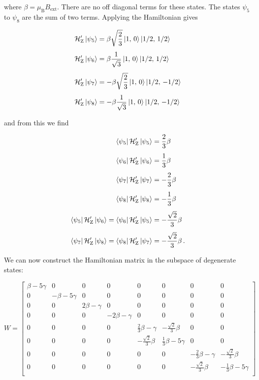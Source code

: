 \documentclass[12pt, titlepage]{article}
\begin{document}
where $\beta = \mu_\text{B}B_\text{ext}$. There are no off diagonal terms for these states. The states $\psi_5$ to $\psi_8$ are the sum of two terms. Applying the Hamiltonian gives

\begin{align*}
	\mathcal{H}_\text{Z}^\prime\ket{\psi_5} &= \beta
	\sqrt{\frac{2}{3}}\ket{1,\, 0}\ket{1/2,\, 1/2} \\[4pt]
	\mathcal{H}_\text{Z}^\prime\ket{\psi_6} &= \beta\frac{1}{\sqrt{3}}\ket{1,\, 0}\ket{1/2,\, 1/2} \\[4pt]
	\mathcal{H}_\text{Z}^\prime\ket{\psi_7} &= -\beta\sqrt{\frac{2}{3}}\ket{1,\, 0}\ket{1/2,\, -1/2} \\[4pt]
	\mathcal{H}_\text{Z}^\prime\ket{\psi_8} &= -\beta\frac{1}{\sqrt{3}}\ket{1,\, 0}\ket{1/2,\, -1/2}
\end{align*}

and from this we find

\begin{align*}
	\bra{\psi_5}\mathcal{H}_\text{Z}^\prime\ket{\psi_5} &= \frac{2}{3}\beta \\[4pt]
	\bra{\psi_6}\mathcal{H}_\text{Z}^\prime\ket{\psi_6} &= \frac{1}{3}\beta \\[4pt]
	\bra{\psi_7}\mathcal{H}_\text{Z}^\prime\ket{\psi_7} &= -\frac{2}{3}\beta \\[4pt]
	\bra{\psi_8}\mathcal{H}_\text{Z}^\prime\ket{\psi_8} &= -\frac{1}{3}\beta \\[4pt]
	\bra{\psi_5}\mathcal{H}_\text{Z}^\prime\ket{\psi_6} = \bra{\psi_6}\mathcal{H}_\text{Z}^\prime\ket{\psi_5}  &= -\frac{\sqrt{2}}{3}\beta \\[4pt]
	\bra{\psi_7}\mathcal{H}_\text{Z}^\prime\ket{\psi_8} = \bra{\psi_8}\mathcal{H}_\text{Z}^\prime\ket{\psi_7}  &= -\frac{\sqrt{2}}{3}\beta \,.
\end{align*}

We can now construct the Hamiltonian matrix in the subspace of degenerate states:

\begin{equation}
	W = \begin{bmatrix}
	\beta-5\gamma & 0 & 0 & 0 & 0 & 0 & 0 & 0 \\
	0 & -\beta-5\gamma & 0 & 0 & 0 & 0 & 0 & 0 \\
	0 & 0 & 2\beta-\gamma & 0 & 0 & 0 & 0 & 0 \\
	0 & 0 & 0 & -2\beta-\gamma & 0 & 0 & 0 & 0 \\
	0 & 0 & 0 & 0 & \frac{2}{3}\beta-\gamma & -\frac{\sqrt{2}}{3}\beta & 0 & 0 \\
	0 & 0 & 0 & 0 & -\frac{\sqrt{2}}{3}\beta & \frac{1}{3}\beta-5\gamma & 0 & 0 \\
	0 & 0 & 0 & 0 & 0 & 0 & -\frac{2}{3}\beta-\gamma & -\frac{\sqrt{2}}{3}\beta \\
	0 & 0 & 0 & 0 & 0 & 0 & -\frac{\sqrt{2}}{3}\beta & -\frac{1}{3}\beta-5\gamma \\
	\end{bmatrix}
\end{equation}
\end{document}
